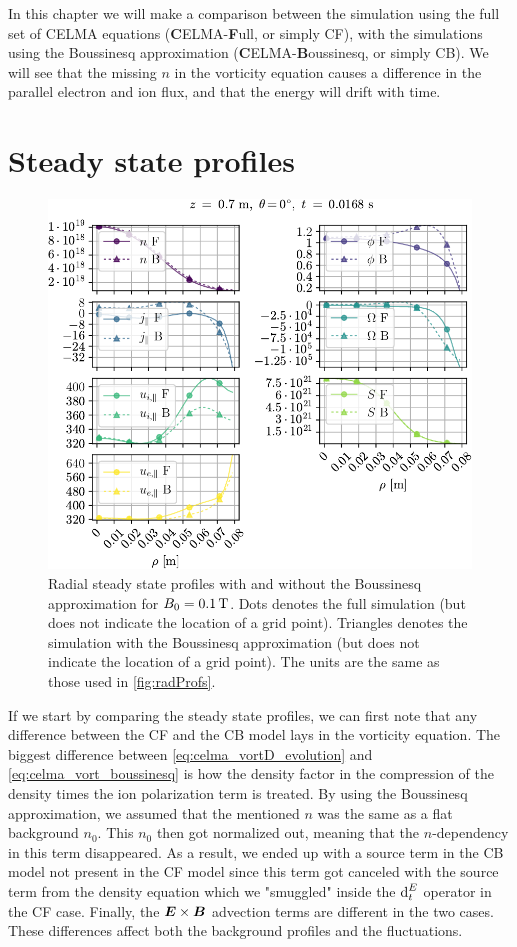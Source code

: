 In this chapter we will make a comparison between the simulation using the full set of CELMA equations (\textbf{C}ELMA-\textbf{F}ull, or simply CF), with the simulations using the Boussinesq approximation (\textbf{C}ELMA-\textbf{B}oussinesq, or simply CB).
We will see that the missing $n$ in the vorticity equation causes a difference in the parallel electron and ion flux, and that the energy will drift with time.

\section{Steady state profiles}
%
\begin{figure}[h]
    \centering
    \includegraphics{fig/results/compareBouss/1DProfRad001B}
    \caption{Radial steady state profiles with and without the Boussinesq approximation for $B_0=0.1\, \text{T}$.
        Dots denotes the full simulation (but does not indicate the location of a grid point).
        Triangles denotes the simulation with the Boussinesq approximation (but does not indicate the location of a grid point).
        The units are the same as those used in \cref{fig:radProfs}.
    }
    \label{fig:compareBoussProfRad}
\end{figure}
%
If we start by comparing the steady state profiles, we can first note that any difference between the CF and the CB model lays in the vorticity equation.
The biggest difference between \cref{eq:celma_vortD_evolution} and \cref{eq:celma_vort_boussinesq} is how the density factor in the compression of the density times the ion polarization term is treated.
By using the Boussinesq approximation, we assumed that the mentioned $n$ was the same as a flat background $n_0$.
This $n_0$ then got normalized out, meaning that the $n$-dependency in this term disappeared.
As a result, we ended up with a source term in the CB model not present in the CF model since this term got canceled with the source term from the density equation which we "smuggled" inside the $\text{d}_t^E$ operator in the CF case.
Finally, the $\boldsymbol{E}\times\boldsymbol{B}$ advection terms are different in the two cases.
These differences affect both the background profiles and the fluctuations.

